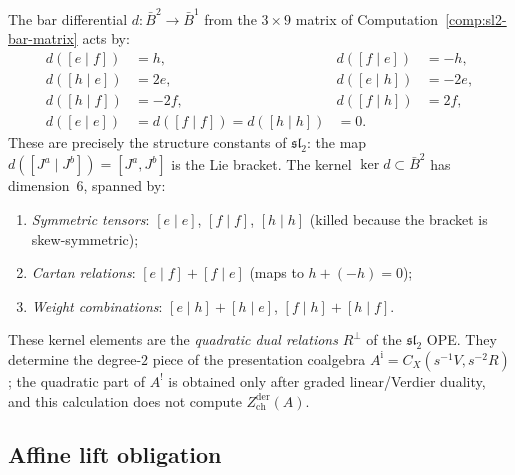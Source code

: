 \begin{computation}
\label{comp:bgg-differential}

The bar differential $d: \bar{B}^2 \to \bar{B}^1$ from the $3 \times 9$
matrix of Computation~\ref{comp:sl2-bar-matrix} acts by:
\begin{align}
d([e \mid f]) &= h, &
d([f \mid e]) &= -h, \label{eq:bgg-diff-bracket}\\
d([h \mid e]) &= 2e, &
d([e \mid h]) &= -2e, \\
d([h \mid f]) &= -2f, &
d([f \mid h]) &= 2f, \\
d([e \mid e]) &= d([f \mid f]) = d([h \mid h]) &= 0. \label{eq:bgg-diff-zero}
\end{align}
These are precisely the structure constants of $\mathfrak{sl}_2$:
the map $d([J^a \mid J^b]) = [J^a, J^b]$ is the Lie bracket.
The kernel $\ker d \subset \bar{B}^2$ has dimension~$6$, spanned by:
\begin{enumerate}[label=\textup{(\alph*)}]
\item \emph{Symmetric tensors}: $[e \mid e]$, $[f \mid f]$, $[h \mid h]$
 (killed because the bracket is skew-symmetric);
\item \emph{Cartan relations}: $[e \mid f] + [f \mid e]$
 (maps to $h + (-h) = 0$);
\item \emph{Weight combinations}: $[e \mid h] + [h \mid e]$,
 $[f \mid h] + [h \mid f]$.
\end{enumerate}
These kernel elements are the \emph{quadratic dual relations}
$R^\perp$ of the $\mathfrak{sl}_2$ OPE. They determine the
degree-$2$ piece of the presentation coalgebra
$A^{\mathrm i}=C_X(s^{-1}V,s^{-2}R)$; the
quadratic part of $A^!$ is obtained only after graded
linear/Verdier duality, and this calculation does not compute
$Z^{\mathrm{der}}_{\mathrm{ch}}(A)$.
\end{computation}

\subsection{Affine lift obligation}

